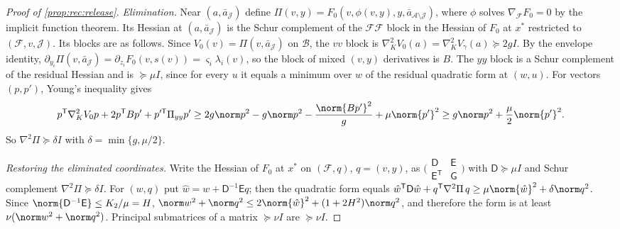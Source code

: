 \begin{proof}[Proof of \cref{prop:rec:release}]
\emph{Elimination.} Near $(a,\bar a_{\mathcal J})$ define $\Pi(v,y)=F_0(v,\phi(v,y),y,
\bar a_{\mathcal A\setminus\mathcal J})$, where $\phi$ solves
$\nabla_{\mathcal F}F_0=0$ by the implicit function theorem. Its Hessian at
$(a,\bar a_{\mathcal J})$ is the Schur complement of the $\mathcal F\mathcal F$ block in the
Hessian of $F_0$ at $x^*$ restricted to $(\mathcal F,v,\mathcal J)$. Its blocks are as
follows. Since $V_0(v)=\Pi(v,\bar a_{\mathcal J})$ on $\mathcal B$, the $vv$ block is
$\nabla_K^2V_0(a)=\nabla_K^2V_\gamma(a)\succeq2gI$. By the envelope identity,
$\partial_{y_i}\Pi(v,\bar a_{\mathcal J})=\partial_{z_i}F_0(v,s(v))=\varsigma_i\lambda_i(v)$,
so the block of mixed $(v,y)$ derivatives is $B$. The $yy$ block is a Schur complement of the
residual Hessian and is $\succeq\mu I$, since for every $u$ it equals a
minimum over $w$ of the residual quadratic form at $(w,u)$. For vectors
$(p,p')$, Young's inequality gives
\[
 p^{\mathsf T}\nabla_K^2V_0p+2p^{\mathsf T}Bp'+p'^{\mathsf T}\Pi_{yy}p'
 \ge2g\norm p^2-g\norm p^2-\frac{\norm{Bp'}^2}g+\mu\norm{p'}^2
 \ge g\norm p^2+\frac\mu2\norm{p'}^2 .
\]
So $\nabla^2\Pi\succeq\delta I$ with $\delta=\min\{g,\mu/2\}$.

\emph{Restoring the eliminated coordinates.} Write the Hessian of $F_0$ at $x^*$
on $(\mathcal F,q)$, $q=(v,y)$, as $\bigl(\begin{smallmatrix}\mathsf D&\mathsf E\\
\mathsf E^{\mathsf T}&\mathsf G\end{smallmatrix}\bigr)$ with $\mathsf D\succeq\mu I$
and Schur complement $\nabla^2\Pi\succeq\delta I$. For $(w,q)$ put
$\hat w=w+\mathsf D^{-1}\mathsf Eq$; then the quadratic form equals
$\hat w^{\mathsf T}\mathsf D\hat w+q^{\mathsf T}\nabla^2\Pi\,q\ge
\mu\norm{\hat w}^2+\delta\norm q^2$. Since
$\norm{\mathsf D^{-1}\mathsf E}\le K_2/\mu=H$,
$\norm w^2+\norm q^2\le2\norm{\hat w}^2+(1+2H^2)\norm q^2$, and therefore the
form is at least $\nu(\norm w^2+\norm q^2)$. Principal submatrices of a matrix
$\succeq\nu I$ are $\succeq\nu I$.
\end{proof}

